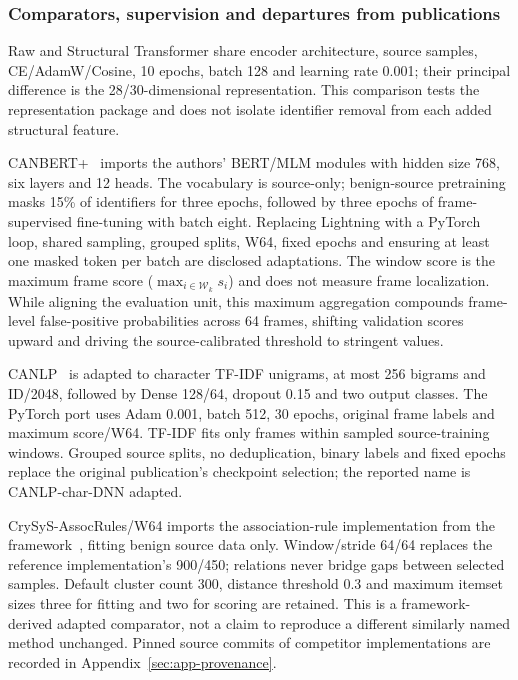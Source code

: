 \documentclass[12pt, a4paper, reqno, oneside]{book}
\begin{document}
\subsubsection{Comparators, supervision and departures from publications}
Raw and Structural Transformer share encoder architecture, source samples, CE/AdamW/Cosine, 10 epochs, batch 128 and learning rate 0.001; their principal difference is the 28/30-dimensional representation. This comparison tests the representation package and does not isolate identifier removal from each added structural feature.

CANBERT+~\cite{won2026canbertplus} imports the authors' BERT/MLM modules with hidden size 768, six layers and 12 heads. The vocabulary is source-only; benign-source pretraining masks 15\% of identifiers for three epochs, followed by three epochs of frame-supervised fine-tuning with batch eight. Replacing Lightning with a PyTorch loop, shared sampling, grouped splits, W64, fixed epochs and ensuring at least one masked token per batch are disclosed adaptations. The window score is the maximum frame score ($\max_{i\in\mathcal{W}_k} s_i$) and does not measure frame localization. While aligning the evaluation unit, this maximum aggregation compounds frame-level false-positive probabilities across 64 frames, shifting validation scores upward and driving the source-calibrated threshold to stringent values.

CANLP~\cite{balasubramanian2025canlp} is adapted to character TF-IDF unigrams, at most 256 bigrams and ID/2048, followed by Dense 128/64, dropout 0.15 and two output classes. The PyTorch port uses Adam 0.001, batch 512, 30 epochs, original frame labels and maximum score/W64. TF-IDF fits only frames within sampled source-training windows. Grouped source splits, no deduplication, binary labels and fixed epochs replace the original publication's checkpoint selection; the reported name is CANLP-char-DNN adapted.

CrySyS-AssocRules/W64 imports the association-rule implementation from the framework~\cite{koltai2026trust}, fitting benign source data only. Window/stride 64/64 replaces the reference implementation's 900/450; relations never bridge gaps between selected samples. Default cluster count 300, distance threshold 0.3 and maximum itemset sizes three for fitting and two for scoring are retained. This is a framework-derived adapted comparator, not a claim to reproduce a different similarly named method unchanged. Pinned source commits of competitor implementations are recorded in Appendix~\ref{sec:app-provenance}.
\end{document}
